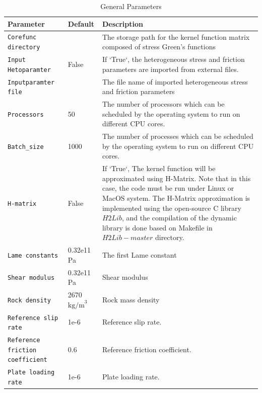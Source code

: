 \documentclass[a4paper,12pt]{article}
\begin{document}
\begin{table}[h!]
    \centering
    \caption{General Parameters}
    \label{tab:module_params}
    \begin{tabular}{|m{3.5cm}|m{2cm}|m{9cm}|}
        \hline
        \textbf{Parameter} & \textbf{Default} & \textbf{Description} \\
        \hline
        \texttt{Corefunc directory} &  & The storage path for the kernel function matrix composed of stress Green's functions \\
        \hline
        \texttt{Input Hetoparamter} &  False & If `True`, the heterogeneous stress and friction parameters are imported from external files. \\
        \hline
        \texttt{Inputparamter file} &  & The file name of imported heterogeneous stress and friction parameters \\
        \hline
	\texttt{Processors} & 50 & The number of processors which can be scheduled by the operating system to run on different CPU cores. \\
        \hline
	\texttt{Batch\_size} & 1000 & The number of processes which can be scheduled by the operating system to run on different CPU cores. \\
        \hline
	\texttt{H-matrix} & False & If `True`, The kernel function will be approximated using H-Matrix. Note that in this case, the code must be run under Linux or MacOS system. The H-Matrix approximation is implemented using the open-source C library $H2Lib$, and the compilation of the dynamic library is done based on Makefile in $H2Lib-master$ directory. \\
\hline	
\texttt{Lame constants} & 0.32e11 Pa & The first Lame constant \\
        \hline
\texttt{Shear modulus} & 0.32e11 Pa&  Shear modulus\\
        \hline
\texttt{Rock density} & 2670 $\text{kg/m}^3$ & Rock mass density\\
        \hline
\texttt{Reference slip rate} & 1e-6& Reference slip rate.\\
        \hline
\texttt{Reference friction coefficient} & 0.6& Reference friction coefficient.\\
        \hline
\texttt{Plate loading rate} & 1e-6& Plate loading rate.\\
        \hline


    \end{tabular}
\end{table}
\end{document}
